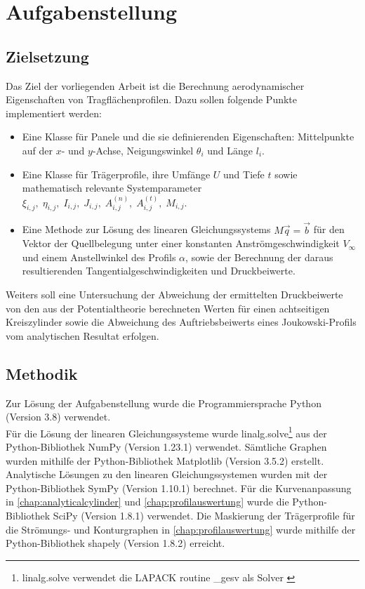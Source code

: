 \chapter{Aufgabenstellung}
%
\section{Zielsetzung}
Das Ziel der vorliegenden Arbeit ist die Berechnung  aerodynamischer Eigenschaften von Tragflächenprofilen. Dazu sollen folgende Punkte implementiert werden:
\begin{itemize}
  \item Eine Klasse für Panele und die sie definierenden Eigenschaften: Mittelpunkte auf der $x$- und $y$-Achse, Neigungswinkel $\theta_{i}$ und Länge $l_i$. %
  \item Eine Klasse für Trägerprofile, ihre Umfänge $U$ und Tiefe $t$ sowie mathematisch relevante Systemparameter $\xi_{i,j}, \; \eta_{i,j}, \; I_{i,j}, \; J_{i,j}, \; A_{i,j}^{(n)}, \;A_{i,j}^{(t)}, \;M_{i,j}$.
  \item Eine Methode zur Lösung des linearen Gleichungssystems $M \vec q = \vec b$ für den Vektor der Quellbelegung unter einer konstanten Anströmgeschwindigkeit $V_{\infty}$ und einem Anstellwinkel des Profils $\alpha $, sowie der Berechnung der daraus resultierenden Tangentialgeschwindigkeiten und Druckbeiwerte.
\end{itemize}
Weiters soll eine Untersuchung der Abweichung der ermittelten Druckbeiwerte von den aus der Potentialtheorie berechneten Werten für einen achtseitigen Kreiszylinder sowie die Abweichung des Auftriebsbeiwerts eines Joukowski-Profils vom analytischen Resultat erfolgen.

\section{Methodik}
Zur Lösung der Aufgabenstellung wurde die Programmiersprache Python (Version 3.8) verwendet. \cite{python2009} \\Für die Lösung der linearen Gleichungssysteme wurde linalg.solve\footnote{linalg.solve verwendet die LAPACK routine \_gesv als Solver \cite{harris2020array}} aus der Python-Bibliothek NumPy (Version 1.23.1) verwendet. \cite{harris2020array} Sämtliche Graphen wurden mithilfe der Python-Bibliothek Matplotlib (Version 3.5.2) erstellt. \cite{Hunter:2007} Analytische Lösungen zu den linearen Gleichungssystemen  wurden mit der Python-Bibliothek SymPy (Version 1.10.1) berechnet. \cite{Sympy} Für die Kurvenanpassung in \ref{chap:analyticalcylinder} und \ref{chap:profilauswertung} wurde die Python-Bibliothek SciPy (Version 1.8.1) verwendet. \cite{2020SciPy-NMeth} Die Maskierung der Trägerprofile für die Strömungs- und Konturgraphen in \ref{chap:profilauswertung} wurde mithilfe der Python-Bibliothek shapely (Version 1.8.2) erreicht. \cite{shapely2007}